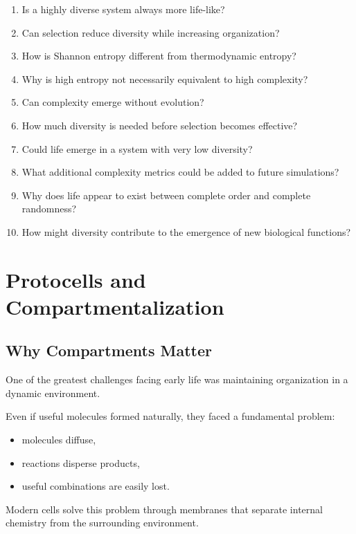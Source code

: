 \documentclass[
  oneside,
  openany]{book}
\providecommand{\tightlist}{%
  \setlength{\itemsep}{0pt}\setlength{\parskip}{0pt}}
\begin{document}
\begin{enumerate}
\def\labelenumi{\arabic{enumi}.}
\tightlist
\item
  Is a highly diverse system always more life-like?
\item
  Can selection reduce diversity while increasing organization?
\item
  How is Shannon entropy different from thermodynamic entropy?
\item
  Why is high entropy not necessarily equivalent to high complexity?
\item
  Can complexity emerge without evolution?
\item
  How much diversity is needed before selection becomes effective?
\item
  Could life emerge in a system with very low diversity?
\item
  What additional complexity metrics could be added to future simulations?
\item
  Why does life appear to exist between complete order and complete randomness?
\item
  How might diversity contribute to the emergence of new biological functions?
\end{enumerate}

\chapter{Protocells and Compartmentalization}\label{protocells-and-compartmentalization}

\section{Why Compartments Matter}\label{why-compartments-matter}

One of the greatest challenges facing early life was maintaining organization in a dynamic environment.

Even if useful molecules formed naturally, they faced a fundamental problem:

\begin{itemize}
\tightlist
\item
  molecules diffuse,
\item
  reactions disperse products,
\item
  useful combinations are easily lost.
\end{itemize}

Modern cells solve this problem through membranes that separate internal chemistry from the surrounding environment.
\end{document}
